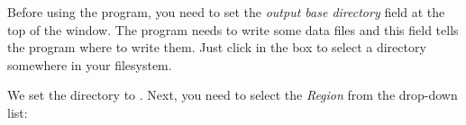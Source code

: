 \documentclass{manual}
\begin{document}
\begin{figure}[ht]
  \centerline{}
  \label{fig:event1}
\end{figure}

Before using the program, you need to set the \emph{output base directory} field at the top
of the window.  The program needs to write
some data files and this field tells the program where to write them.  Just click in the box to
select a directory somewhere in your filesystem.

\pagebreak

We set the directory to . 
Next, you need to select the \emph{Region} from the drop-down list:
\end{document}
